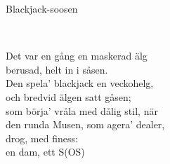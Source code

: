 \begin{song}{Blackjack-soosen}
	
	
	\\
	
	
	Det var en gång en maskerad älg\\
	berusad, helt in i såsen.\\
	Den spela’ blackjack en veckohelg,\\
	och bredvid älgen satt gåsen;\\
	som börja’ vråla med dålig stil, när\\
	den runda Musen, som agera’ dealer,\\
	drog, med finess:\\
	en dam, ett S(OS)

	
\end{song}
